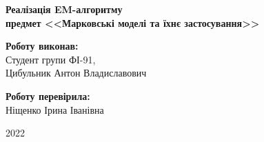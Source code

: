 \begin{titlepage}
    \begin{center}
        \begin{spacing}{1.5}
            \textbf{\Large{Реалізація EM-алгоритму}} \\ 
            \vspace{1cm}\textbf{\normalsize{предмет <<Марковські моделі та їхнє застосування>>}}
        \end{spacing}
    \end{center}
    
    \vspace{\fill}
    
    \newlength{\maxname}

    \hfill\parbox{\maxname}{
        \begin{spacing}{1.1}
            \small{\textbf{Роботу виконав:}} \\ 
            \small{Студент групи ФІ-91,} \\
            \small{Цибульник Антон Владиславович} \\
        \end{spacing}
    }

    \hfill\parbox{\maxname}{
        \begin{spacing}{1.1}
            \small{\textbf{Роботу перевірила:}} \\ 
            \small{Ніщенко Ірина Іванівна} \\
        \end{spacing}
    }

    \vspace{0.5cm}

    \begin{center}
        \small{2022}
    \end{center}
    
\end{titlepage}